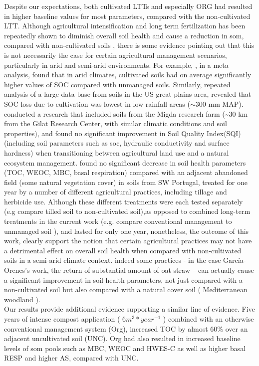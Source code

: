 	Despite our expectations, both cultivated LTTs and especially ORG had resulted in higher baseline values for most parameters, compared with the non-cultivated LTT. Although agricultural intensification and long term fertilization has been repeatedly shown to diminish overall soil health and cause a reduction in \gls{som}, compared with non-cultivated soils \citep{laurance2014, mganga2016, tilman2011}, there is some evidence pointing out that this is not necessarily the case for certain agricultural management scenarios, particularly in arid and semi-arid environments.  For example, \citet{trivedi2016}, in a meta analysis, found that in arid climates, cultivated soils had on average significantly higher values of SOC compared with unmanaged soils. Similarly, repeated analysis of a large data base from soils in the US great plains area, revealed that SOC loss due to cultivation was lowest in low rainfall areas ($ \sim $300 mm MAP)\citep{miller2004, burke1989}. \citet{paz-kagan2014} conducted a research that included soils from the Migda research farm (\~{}30 km from the Gilat Research Center, with similar climatic conditions and soil properties), and found no significant improvement in Soil Quality Index(SQI) (including soil parameters such as \gls{soc}, hydraulic conductivity and surface hardness) when transitioning between agricultural land use and a natural ecosystem management. \citet{garcia-orenes2010} found no significant decrease in soil health parameters (TOC, WEOC, MBC, basal respiration) compared with an adjacent abandoned field (some natural vegetation cover) in soils from SW Portugal, treated for one year by  a number of different agricultural practices, including tillage and herbicide use. Although these different treatments were each tested separately (e.g compare tilled soil to non-cultivated soil),as opposed to combined long-term treatments in the current work (e.g. compare conventional management to unmanaged soil ), and lasted for only one year, nonetheless, the outcome of this work, clearly support the notion that certain agricultural practices may not have a detrimental effect on overall soil health when compared with non-cultivated soils in a semi-arid climate context. indeed some practices - in the case García-Orenes’s work, the return of substantial amount of oat straw – can actually cause a significant improvement in soil health parameters, not just compared with a non-cultivated soil but also compared with a natural cover soil ( Mediterranean woodland ).\\
	Our results provide additional evidence supporting a similar line of evidence. Five years of intense compost application ( $ 6 m^3*year^{-1} $ ) combined with an otherwise conventional management system (Org), increased TOC by almost 60\% over an adjacent uncultivated soil (UNC). Org had also resulted in increased baseline levels of \gls{som} pools such as MBC, WEOC  and HWES-C  as well as higher basal RESP and higher AS, compared with UNC. \\

